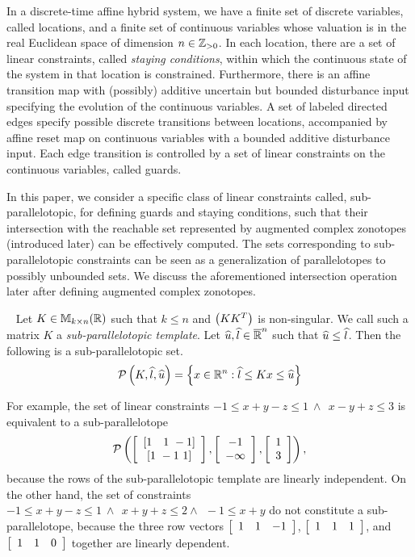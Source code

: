 
In a discrete-time affine hybrid system, we have a finite set of
discrete variables, called locations, and a finite set of continuous
variables whose valuation is in the real Euclidean space of dimension
$n\in\mathbb{Z}_{> 0}$.  In each location, there are a set of linear constraints,
called \emph{staying conditions}, within which the continuous state of
the system in that location is constrained.  Furthermore, there is
an affine transition map with (possibly) additive uncertain but
bounded disturbance input specifying the evolution of the continuous
variables. A set of labeled directed edges specify possible
discrete transitions between locations, accompanied by affine
reset map on continuous variables with a bounded additive
disturbance input. Each edge transition is controlled by a set of
linear constraints on the continuous variables, called guards.

In this paper, we consider a specific class of linear constraints
called, sub-parallelotopic, for defining guards and staying conditions,
such that their intersection with the reachable set represented by augmented complex zonotopes (introduced
later) can be effectively computed. The sets corresponding to sub-parallelotopic constraints can be seen as a
generalization of parallelotopes to possibly unbounded sets.  We
discuss the aforementioned intersection operation later after
defining augmented complex zonotopes.
%
\begin{definition}~\label{defn:sub-parallelotope} Let
  $K\in\mathbb{M}_{k\times n}(\mathbb{R})$ such that $k\leq n$ and $\left(KK^T\right)$ is
  non-singular.  We call such a matrix $K$ a
  \emph{sub-parallelotopic template}.  Let
  $\widehat{u},\widehat{l}\in\mathbb{\overline{R}}^n$ such that $\widehat{u}\leq\widehat{l}$.  Then
  the following is a sub-parallelotopic set.
\[
\mathcal{P}\left(K,\widehat{l},\widehat{u}\right) = \left\{x\in\mathbb{R}^n: \widehat{l}\leq Kx \leq \widehat{u}\right\}
\]
\end{definition}
%
For example, the set of linear constraints $-1\leq x+y-z\leq
1~\wedge~~ x-y+z\leq 3$ is equivalent to a sub-parallelotope
$$\mathcal{P}\left(\left[\begin{array}{c}{\left[1~~~1~-1\right]}\\{\left[1~-1~1\right]} \end{array}\right],\left[\begin{array}{c}{-1}\\{-\infty} \end{array}\right],\left[\begin{array}{c}{1}\\{3} \end{array}\right]\right),$$
because the rows of the sub-parallelotopic template are linearly
independent.  On the other hand, the set of constraints $-1\leq
x+y-z\leq 1~\wedge~~x+y+z\leq 2\wedge~~-1\leq x+y$ do not constitute a
sub-parallelotope, because the three row vectors $\left[\begin{array}{c
c c}1 & 1 & -1\end{array}\right]$, $\left[\begin{array}{c c c}1 & 1 &
1\end{array}\right]$, and $\left[\begin{array}{c c c}1 & 1 &
0\end{array}\right]$ together are linearly dependent. 

